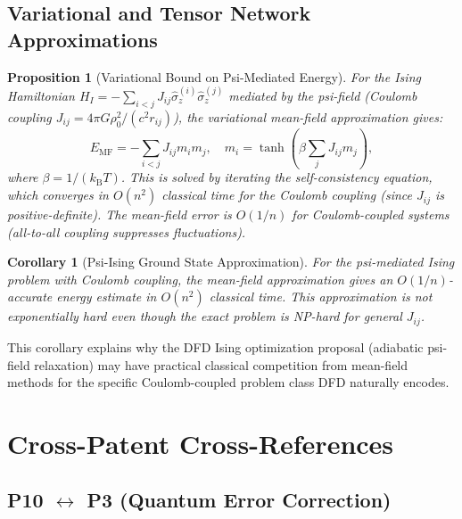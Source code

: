 \documentclass[11pt]{article}
\newtheorem{proposition}[theorem]{Proposition}
\newtheorem{corollary}[theorem]{Corollary}
\theoremstyle{definition}
\theoremstyle{remark}
\newcommand{\kB}{k_{\mathrm{B}}}
\begin{document}
\subsection{Variational and Tensor Network Approximations}

\begin{proposition}[Variational Bound on Psi-Mediated Energy]
\label{prop:variational}
For the Ising Hamiltonian $H_I = -\sum_{i<j} J_{ij}\hat{\sigma}_z^{(i)}
\hat{\sigma}_z^{(j)}$ mediated by the psi-field (Coulomb coupling
$J_{ij} = 4\pi G\rho_0^2/(c^2 r_{ij})$), the variational mean-field
approximation gives:
\begin{equation}
E_{\mathrm{MF}} = -\sum_{i<j} J_{ij} m_i m_j, \quad m_i = \tanh\!\left(\beta\sum_j J_{ij} m_j\right),
\label{eq:mf}
\end{equation}
where $\beta = 1/(\kB T)$. This is solved by iterating the self-consistency
equation, which converges in $O(n^2)$ classical time for the Coulomb
coupling (since $J_{ij}$ is positive-definite). The mean-field error
is $O(1/n)$ for Coulomb-coupled systems (all-to-all coupling suppresses
fluctuations).
\end{proposition}

\begin{corollary}[Psi-Ising Ground State Approximation]
For the psi-mediated Ising problem with Coulomb coupling, the mean-field
approximation gives an $O(1/n)$-accurate energy estimate in $O(n^2)$
classical time. This approximation is \emph{not} exponentially hard even
though the exact problem is NP-hard for general $J_{ij}$.
\end{corollary}

This corollary explains why the DFD Ising optimization proposal
(adiabatic psi-field relaxation) may have practical classical competition
from mean-field methods for the specific Coulomb-coupled problem class
DFD naturally encodes.

\section{Cross-Patent Cross-References}
\label{sec:cross_refs}

\subsection{P10 $\leftrightarrow$ P3 (Quantum Error Correction)}
\label{sec:p10_p3}
\end{document}
